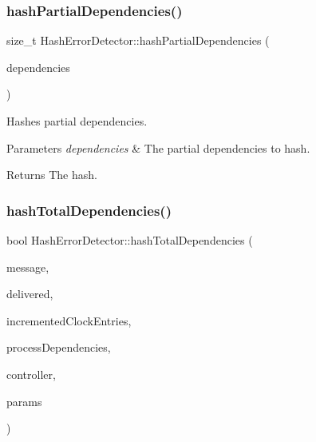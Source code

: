 \subsubsection{\texorpdfstring{hash\+Partial\+Dependencies()}{hashPartialDependencies()}\hspace{0.1cm}{\footnotesize\ttfamily [2/2]}}
{\footnotesize\ttfamily size\+\_\+t Hash\+Error\+Detector\+::hash\+Partial\+Dependencies (\begin{DoxyParamCaption}\item[{const \hyperlink{class_partial_dependencies}{Partial\+Dependencies} \&}]{dependencies }\end{DoxyParamCaption})}



Hashes partial dependencies. 


\begin{DoxyParams}{Parameters}
{\em dependencies} & The partial dependencies to hash. \\
\hline
\end{DoxyParams}
\begin{DoxyReturn}{Returns}
The hash. 
\end{DoxyReturn}
\mbox{\label{class_hash_error_detector_a13dd5fae3ca4898bd91d1801beed24a4}} 
\subsubsection{\texorpdfstring{hash\+Total\+Dependencies()}{hashTotalDependencies()}\hspace{0.1cm}{\footnotesize\ttfamily [1/2]}}
{\footnotesize\ttfamily bool Hash\+Error\+Detector\+::hash\+Total\+Dependencies (\begin{DoxyParamCaption}\item[{const \hyperlink{structures_8h_a7e7bdc1d2fff8a9436f2f352b2711ed6}{message\+Info} \&}]{message,  }\item[{const vector$<$ \hyperlink{structures_8h_a7e7bdc1d2fff8a9436f2f352b2711ed6}{message\+Info} $>$ \&}]{delivered,  }\item[{const vector$<$ unsigned int $>$ \&}]{incremented\+Clock\+Entries,  }\item[{const \hyperlink{class_total_dependencies}{Total\+Dependencies} \&}]{process\+Dependencies,  }\item[{\hyperlink{class_controller}{Controller} $\ast$}]{controller,  }\item[{\hyperlink{class_simulation_parameters}{Simulation\+Parameters} $\ast$}]{params }\end{DoxyParamCaption})}



